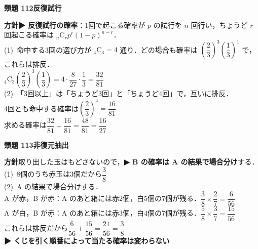 \documentclass[a4paper,11pt]{ltjsarticle}
\newcommand{\ans}[2]{\Needspace{5\baselineskip}\vspace{6pt}%
  {\sffamily\bfseries 類題 #1\quad #2}\par}
\newcommand{\point}[1]{\textsf{\bfseries ▶ #1}}
\begin{document}
\ans{112}{反復試行}
\begin{kai}
\textbf{方針}\quad \point{反復試行の確率}：1回で起こる確率が $p$ の試行を $n$ 回行い，ちょうど $r$ 回起こる確率は ${}_n\mathrm C_rp^r(1-p)^{n-r}$．\\[2pt]
(1)\ 命中する3回の選び方が ${}_4\mathrm C_3=4$ 通り．どの場合も確率は $\left(\dfrac23\right)^3\left(\dfrac13\right)^1$ で，これらは排反．\\
\hspace*{1.5em}${}_4\mathrm C_3\left(\dfrac23\right)^3\left(\dfrac13\right)=4\cdot\dfrac{8}{27}\cdot\dfrac13=\dfrac{32}{81}$\\[2pt]
(2)\ 「3回以上」は「ちょうど3回」と「ちょうど4回」で，互いに排反．\\
\hspace*{1.5em}4回とも命中する確率は\quad $\left(\dfrac23\right)^4=\dfrac{16}{81}$\\
\hspace*{1.5em}求める確率は\quad $\dfrac{32}{81}+\dfrac{16}{81}=\dfrac{48}{81}=\dfrac{16}{27}$
\end{kai}

\ans{113}{非復元抽出}
\begin{kai}
\textbf{方針}\quad 取り出した玉はもどさないので，\point{B の確率は A の結果で場合分け}する．\\[2pt]
(1)\ 8個のうち赤玉は3個だから\quad $\dfrac38$\\[2pt]
(2)\ A の結果で場合分けする．\\
\hspace*{1.5em}A が赤，B が赤：A のあと箱には赤2個，白5個の7個が残る．\quad $\dfrac38\times\dfrac27=\dfrac{6}{56}$\\[2pt]
\hspace*{1.5em}A が白，B が赤：A のあと箱には赤3個，白4個の7個が残る．\quad $\dfrac58\times\dfrac37=\dfrac{15}{56}$\\[2pt]
\hspace*{1.5em}これらは排反だから\quad $\dfrac{6}{56}+\dfrac{15}{56}=\dfrac{21}{56}=\dfrac38$\\
\hspace*{1.5em}\point{くじを引く順番によって当たる確率は変わらない}
\end{kai}
\end{document}
